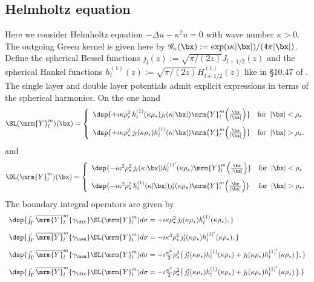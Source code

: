 \documentclass[a4paper,11pt]{article}
\begin{document}
\subsection{Helmholtz equation}\label{Helmholtz3D}

Here we consider Helmholtz equation $-\Delta u-\kappa^{2} u =0$ with wave number $\kappa>0$. The outgoing Green kernel
is given here by $\mathscr{G}_{\kappa}(\bx):=\exp(\imath\kappa\vert\bx\vert)/(4\pi\vert \bx\vert)$.
Define the spherical Bessel functions $j_{l}(z) := \sqrt{\pi/(2z)}J_{l+1/2}(z)$ and the spherical Hankel functions
$h_{l}^{(1)}(z):= \sqrt{\pi/(2z)}H^{(1)}_{l+1/2}(z)$ like in \S 10.47 of \cite{MR2723248}.
The single layer and double layer potentials admit explicit expressions in terms of the spherical harmonics.
On the one hand\\
$$
\SL(\mrm{Y}_{l}^{m})(\bx) =
\left\{\begin{array}{ll}
\dsp{+\imath\kappa\rho_{\star}^{2}\, h^{(1)}_{l}(\kappa\rho_{\star})j_{l}(\kappa\vert \bx\vert)\mrm{Y}_{l}^{m}\Big(\frac{\bx}{\vert\bx\vert}\Big)} & \textrm{for}\;\;\vert \bx\vert<\rho_{\star}\\[10pt]
\dsp{+\imath\kappa\rho_{\star}^{2}\, j_{l}(\kappa\rho_{\star})h^{(1)}_{l}(\kappa\vert \bx\vert)\mrm{Y}_{l}^{m}\Big(\frac{\bx}{\vert\bx\vert}\Big)   } & \textrm{for}\;\;\vert\bx\vert>\rho_{\star}.
\end{array}\right.
$$
and
$$
\DL(\mrm{Y}_{l}^{m})(\bx) =
\left\{\begin{array}{ll}
\dsp{-\imath\kappa^{2}\rho_{\star}^{2}\, j_{l}(\kappa\vert \bx\vert)h^{(1)'}_{l}(\kappa\rho_{\star})\mrm{Y}_{l}^{m}\Big(\frac{\bx}{\vert\bx\vert}\Big) }
& \textrm{for}\;\;\vert\bx\vert<\rho_{\star}\\[10pt]
\dsp{-\imath\kappa^{2}\rho_{\star}^{2}\, h^{(1)}_{l}(\kappa\vert \bx\vert)j_{l}'(\kappa\rho_{\star})\mrm{Y}_{l}^{m}\Big(\frac{\bx}{\vert\bx\vert}\Big) }
& \textrm{for}\;\;\vert\bx\vert>\rho_{\star}.
\end{array}\right.
$$
The boundary integral operators are given by
$$
\begin{array}{l}
\dsp{ \int_{\Gamma}\overline{\mrm{Y}}_{l}^{m}\{\gamma_{\dir}\}\SL(\mrm{Y}_{l}^{m}) d\sigma = +\imath\kappa \rho_{\star}^{2}\,j_{l}(\kappa\rho_{\star})h_{l}^{(1)}(\kappa\rho_{\star}), }\\[10pt]
\dsp{ \int_{\Gamma}\overline{\mrm{Y}}_{l}^{m}\{\gamma_{\neu}\}\DL(\mrm{Y}_{l}^{m}) d\sigma = -\imath\kappa^{3}\rho_{\star}^{2} \,j_{l}'(\kappa\rho_{\star})h_{l}^{(1)'}(\kappa\rho_{\star}), }\\[10pt]
\dsp{ \int_{\Gamma}\overline{\mrm{Y}}_{l}^{m}\{\gamma_{\neu}\}\SL(\mrm{Y}_{l}^{m}) d\sigma = +\imath\frac{\kappa^{2}}{2}\rho_{\star}^{2}
\big( \,j_{l}'(\kappa\rho_{\star})h_{l}^{(1)}(\kappa\rho_{\star}) +  j_{l}(\kappa\rho_{\star})h_{l}^{(1)'}(\kappa\rho_{\star})\,\big), }\\[10pt]
\dsp{ \int_{\Gamma}\overline{\mrm{Y}}_{l}^{m}\{\gamma_{\dir}\}\DL(\mrm{Y}_{l}^{m}) d\sigma = -\imath\frac{\kappa^{2}}{2}\rho_{\star}^{2}
\big( \,j_{l}'(\kappa\rho_{\star})h_{l}^{(1)}(\kappa\rho_{\star}) +  j_{l}(\kappa\rho_{\star})h_{l}^{(1)'}(\kappa\rho_{\star})\,\big). }
\end{array}
$$
\end{document}
